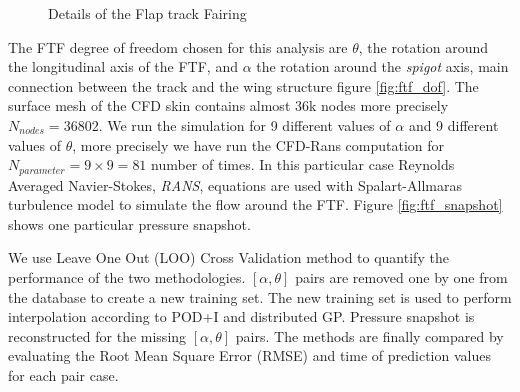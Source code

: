 \begin{figure}[!ht]
  \centering
  \quad
  \quad
      \caption{Details of the Flap track Fairing}
\end{figure}


The FTF degree of freedom chosen for this analysis are $\theta$, the rotation around the longitudinal axis of the FTF, and $\alpha$ the rotation around the {\it spigot} axis, main connection between the track and the wing structure figure \ref{fig:ftf_dof}. The surface mesh of the CFD skin contains almost 36k nodes more precisely \(N_{nodes} = 36802\). We run the simulation for 9 different values of \(\alpha\) and 9 different values of \(\theta\), more precisely we have run the CFD-Rans computation for \(N_{parameter} = 9\times9 = 81\) number of times. In this particular case Reynolds Averaged  Navier-Stokes, {\it RANS}, equations are used with Spalart-Allmaras turbulence model to simulate the flow around the FTF. Figure \ref{fig:ftf_snapshot} shows one particular pressure snapshot. 

We use Leave One Out (LOO) Cross Validation method to quantify the performance of the two methodologies. $[\alpha, \theta]$ pairs are removed one by one from the database to create a new training set. The new training set is used to perform interpolation according to POD+I and distributed GP. Pressure snapshot is reconstructed for the missing $[\alpha, \theta]$ pairs. The methods are finally compared by evaluating the Root Mean Square Error (RMSE) and time of prediction values for each pair case. 

